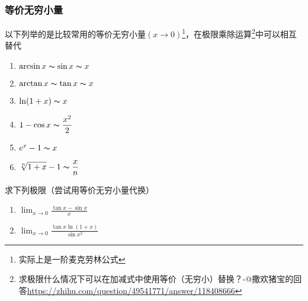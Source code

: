 \subsubsection{等价无穷小量}
以下列举的是比较常用的等价无穷小量$(x\to 0)$\footnote{实际上是一阶麦克劳林公式}，在极限乘除运算\footnote{求极限什么情况下可以在加减式中使用等价（无穷小）替换？-@撒欢猪宝的回答\url{https://zhihu.com/question/49541771/answer/118408666}}中可以相互替代
\begin{enumerate}
	\itemsep -3pt
	\item $\arcsin x\thicksim\sin x\thicksim x$
	\item $\arctan x\thicksim\tan x\thicksim x$
	\item $\ln(1+x)\thicksim x$
	\item $\displaystyle 1-\cos x\thicksim\frac{x^2}{2}$
	\item $e^x-1\thicksim x$
	\item $\displaystyle \sqrt[n]{1+x}-1\thicksim\frac{x}{n}$
\end{enumerate}
\begin{exercise}
求下列极限（尝试用等价无穷小量代换）
\begin{enumerate}
	\item $\displaystyle\lim_{x\to 0}\frac{\tan x-\sin x}{x}$
	\item $\displaystyle\lim_{x\to 0}\frac{\tan x\ln(1+x)}{\sin x^2}$
\end{enumerate}
\end{exercise}

